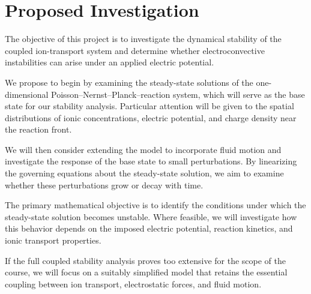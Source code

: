 \documentclass[11pt]{article}
\begin{document}
\section{Proposed Investigation}

The objective of this project is to investigate the
dynamical stability of the coupled ion-transport system
and determine whether electroconvective instabilities
can arise under an applied electric potential.

We propose to begin by examining the steady-state
solutions of the one-dimensional
Poisson--Nernst--Planck--reaction system, which
will serve as the base state for our stability
analysis. Particular attention will be given to
the spatial distributions of ionic concentrations,
electric potential, and charge density near the
reaction front.

We will then consider extending the model to
incorporate fluid motion and investigate the
response of the base state to small perturbations.
By linearizing the governing equations about the
steady-state solution, we aim to examine whether
these perturbations grow or decay with time.

The primary mathematical objective is to identify
the conditions under which the steady-state
solution becomes unstable. Where feasible, we
will investigate how this behavior depends on
the imposed electric potential, reaction kinetics,
and ionic transport properties.

If the full coupled stability analysis proves
too extensive for the scope of the course, we
will focus on a suitably simplified model that
retains the essential coupling between ion
transport, electrostatic forces, and fluid motion.


\printbibliography
\end{document}
